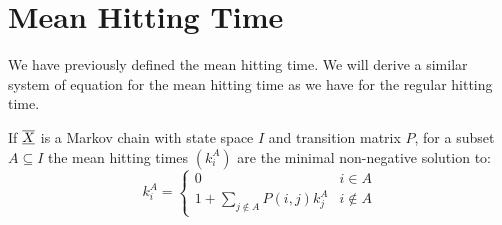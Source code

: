 \documentclass[../Main.tex]{subfiles}
\begin{document}
\section{Mean Hitting Time}
We have previously defined the mean hitting time. We will derive a similar system of equation for the mean hitting time as we have for the regular hitting time.
\begin{theorem}
    If $\underline{\overline{X}}$ is a Markov chain with state space $I$ and transition matrix $P$, for a subset $A \subseteq I$ the mean hitting times $(k_i^A)$ are the minimal non-negative solution to:
    \begin{equation*}
        k_i^A =
        \begin{cases}
            0 & i \in A \\
            1 + \sum_{j \notin A} P(i, j) k_j^A & i \notin A
        \end{cases}
    \end{equation*}
    \label{thmMeanHittingProb}
\end{theorem}
\end{document}
